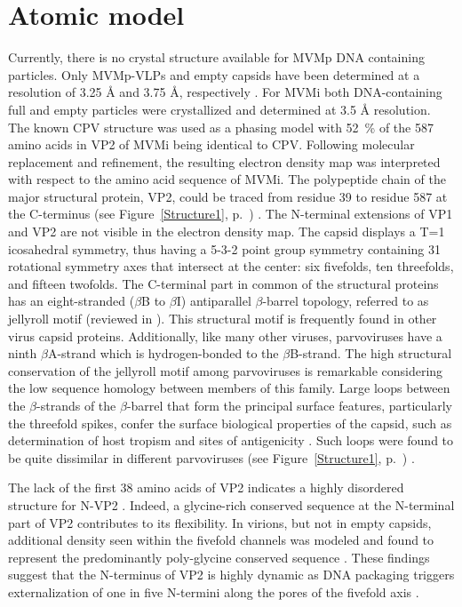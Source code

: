 \section{Atomic model}
\label{Structure}
Currently, there is no crystal structure available for MVMp DNA containing particles. Only MVMp-VLPs and empty capsids have been determined at a resolution of 3.25 \r{A} and 3.75 \r{A}, respectively \cite{pmid16103145}. For MVMi both DNA-containing full and empty particles were crystallized and determined at 3.5 \r{A} resolution. The known CPV structure \cite{pmid3379641} was used as a phasing model with 52~\% of the 587 amino acids in VP2 of MVMi being identical to CPV. Following molecular replacement and refinement, the resulting electron density map was interpreted with respect to the amino acid sequence of MVMi. The polypeptide chain of the major structural protein, VP2, could be traced from residue 39 to residue 587 at the C-terminus (see Figure~\ref{Structure1}, p.~\pageref{Structure1}) \cite{pmid15299974}. The N-terminal extensions of VP1 and VP2 are not visible in the electron density map. The capsid displays a T=1 icosahedral symmetry, thus having a 5-3-2 point group symmetry containing 31 rotational symmetry axes that intersect at the center: six fivefolds, ten threefolds, and fifteen twofolds. The C-terminal part in common of the structural proteins has an eight-stranded ($\beta$B to $\beta$I) antiparallel $\beta$-barrel topology, referred to as jellyroll motif (reviewed in \cite{pmid2673017, Fundamental_Virology}). This structural motif is frequently found in other virus capsid proteins. Additionally, like many other viruses, parvoviruses have a ninth $\beta$A-strand which is hydrogen-bonded to the $\beta$B-strand. The high structural conservation of the jellyroll motif among parvoviruses is remarkable considering the low sequence homology between members of this family. Large loops between the $\beta$-strands of the $\beta$-barrel that form the principal surface features, particularly the threefold spikes, confer the surface biological properties of the capsid, such as determination of host tropism \cite{pmid1316457, pmid3942033} and sites of antigenicity \cite{pmid8985402, pmid1942246}. Such loops were found to be quite dissimilar in different parvoviruses (see Figure~\ref{Structure1}, p.~\pageref{Structure1}) \cite{pmid8503170}. 

The lack of the first 38 amino acids of VP2 indicates a highly disordered structure for N-VP2 \cite{pmid15299974}. Indeed, a glycine-rich conserved sequence at the N-terminal part of VP2 contributes to its flexibility. In virions, but not in empty capsids, additional density seen within the fivefold channels was modeled and found to represent the predominantly poly-glycine conserved sequence \cite{pmid15299494, pmid8969301}. These findings suggest that the N-terminus of VP2 is highly dynamic as DNA packaging triggers externalization of one in five N-termini along the pores of the fivefold axis \cite{pmid9817841}.
 
